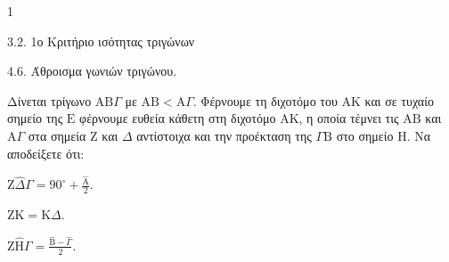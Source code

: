 \begin{ylh}{1}
    \item 3.2. 1ο Κριτήριο ισότητας τριγώνων
    \item 4.6. Άθροισμα γωνιών τριγώνου.
\end{ylh}
Δίνεται τρίγωνο $\mathrm{A}\mathrm{B}\Gamma$ με $\mathrm{A}\mathrm{B} < \mathrm{A}\Gamma$. Φέρνουμε τη διχοτόμο του $\mathrm{A}\mathrm{K}$ και σε τυχαίο σημείο της $\mathrm{E}$ φέρνουμε ευθεία κάθετη στη διχοτόμο $\mathrm{A}\mathrm{K}$, η οποία τέμνει τις $\mathrm{A}\mathrm{B}$ και $\mathrm{A}\Gamma$ στα σημεία $\mathrm{Z}$ και $\Delta$ αντίστοιχα και την προέκταση της $\Gamma\mathrm{B}$ στο σημείο $\mathrm{H}$.
Να αποδείξετε ότι:
\begin{alist}
    \item $\mathrm{Z}\hat{\Delta}\Gamma = 90^\circ + \frac{\hat{\mathrm{A}}}{2}$. 
    \item $\mathrm{Z}\mathrm{K} = \mathrm{K}\Delta$. 
    \item $\mathrm{Z}\hat{\mathrm{H}}\Gamma = \frac{\hat{\mathrm{B}} - \hat{\Gamma}}{2}$. 
\end{alist}
